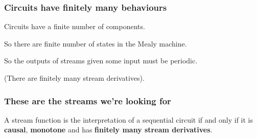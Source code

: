 \begin{frame}
    \frametitle{Circuits have finitely many behaviours}

    Circuits have a finite number of components.

    \wait

    So there are finite number of states in the Mealy machine.

    \wait

    So the outputs of streams given some input must be \alert{periodic}.

    \wait

    (There are finitely many \alert{stream derivatives}).
\end{frame}
\begin{frame}
    \frametitle{These are the streams we're looking for}

    \begin{theorem}
        A stream function is the interpretation of a sequential circuit
        if and only if it is \textbf{causal}, \textbf{monotone} and has
        \textbf{finitely many stream derivatives}.
    \end{theorem}
\end{frame}
